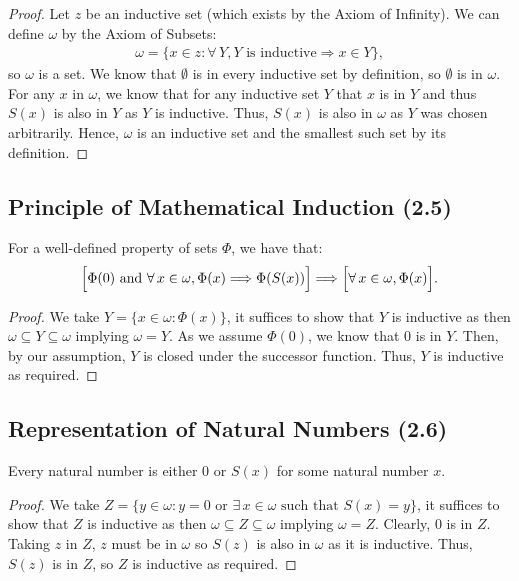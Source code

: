 \begin{proof}
    Let $z$ be an inductive set (which exists by the Axiom of Infinity). 
    We can define $\omega$ by the Axiom of Subsets: 
    \begin{align*}
        \omega = \{x \in z : \forall \, Y, Y \text{ is inductive} \Longrightarrow x \in Y \},
    \end{align*} so $\omega$ is a set.
    We know that $\emptyset$ is in every inductive set by definition,
    so $\emptyset$ is in $\omega$. For any $x$ in $\omega$, we know that for any
    inductive set $Y$ that $x$ is in $Y$ and thus $S(x)$ is also in $Y$ as $Y$ is
    inductive. Thus, $S(x)$ is also in $\omega$ as $Y$ was chosen
    arbitrarily. Hence, $\omega$ is an inductive set and the smallest
    such set by its definition.
\end{proof}

\subsection{Principle of Mathematical Induction (2.5)} \label{2.5}

For a well-defined property of sets $\Phi$, we have that:
\begin{align*}
    \Bigl[
        \Phi(0) \text{ and } 
        \forall \, x \in \omega,
        \Phi(x) \Longrightarrow \Phi(S(x)) 
    \Bigr] 
    \Longrightarrow 
    \Bigl[
        \forall \, x \in \omega, \Phi(x)
    \Bigr].
\end{align*}

\begin{proof}
    We take $Y = \{x \in \omega : \Phi(x)\}$, it suffices to show that 
    $Y$ is inductive as then $\omega \subseteq Y \subseteq \omega$ implying $\omega = Y$. 
    As we assume $\Phi(0)$, we know that $0$ is in $Y$. Then, by our assumption,
    $Y$ is closed under the successor function. Thus, $Y$ is inductive as required.
\end{proof}

\subsection{Representation of Natural Numbers (2.6)} \label{2.6}

Every natural number is either $0$ or $S(x)$ for some natural number $x$.

\begin{proof}
    We take $Z = \{y \in \omega : y = 0 \text{ or } 
    \exists \, x \in \omega \text{ such that } S(x) = y\}$, it 
    suffices to show that $Z$ is inductive as then 
    $\omega \subseteq Z \subseteq \omega$ implying $\omega = Z$. 
    Clearly, $0$ is in $Z$. Taking $z$ in $Z$, $z$ must be in $\omega$
    so $S(z)$ is also in $\omega$ as it is inductive. Thus, $S(z)$ is
    in $Z$, so $Z$ is inductive as required.
\end{proof}

